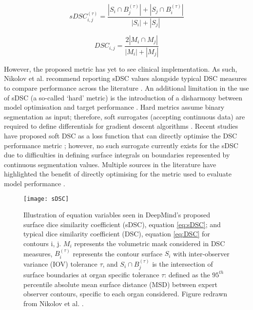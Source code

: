 \begin{equation}
sDSC_{i,j}^{(\tau)} = \frac{|S_{i} \cap B_{j}^{(\tau)}| + |S_{j} \cap B_{i}^{(\tau)}|}{|S_{i}| + |S_{j}|}
\label{eq:sDSC}
\end{equation}

\begin{equation}
DSC_{i,j} = \frac{2|M_{i} \cap M_{j}|}{|M_{i}| + |M_{j}|}
\label{eq:DSC}
\end{equation}

However, the proposed metric has yet to see clinical implementation. As such, Nikolov et al. recommend reporting sDSC values alongside typical DSC measures to compare performance across the literature \cite{Nikolov_2018}. An additional limitation in the use of sDSC (a so-called `hard' metric) is the introduction of a disharmony between model optimisation and target performance \cite{Bertels2019}. Hard metrics assume binary segmentation as input; therefore, soft surrogates (accepting continuous data) are required to define differentials for gradient descent algorithms \cite{Bertels2019}. Recent studies have proposed soft DSC as a loss function that can directly optimise the DSC performance metric \cite{Bertels2019}; however, no such surrogate currently exists for the sDSC due to difficulties in defining surface integrals on boundaries represented by continuous segmentation values. Multiple sources in the literature have highlighted the benefit of directly optimising for the metric used to evaluate model performance \cite{Bertels2019, Vapnik2000}.

\begin{figure}
	\begin{center}
		\texttt{[image: sDSC]}
		\caption{Illustration of equation variables seen in DeepMind's proposed surface dice similarity coefficient (sDSC), equation \ref{eq:sDSC}; and typical dice similarity coefficient (DSC), equation \ref{eq:DSC} for contours i, j. $M_{i}$ represents the volumetric mask considered in DSC measures, $B_{i}^{(\tau)}$ represents the contour surface $S_{i}$ with inter-observer variance (IOV) tolerance $\tau$, and $S_{i} \cap B_{j}^{(\tau)}$ is the intersection of surface boundaries at organ specific tolerance $\tau$: defined as the $95^{th}$ percentile absolute mean surface distance (MSD) between expert observer contours, specific to each organ considered. Figure redrawn from Nikolov et al. \cite{Nikolov_2018}.}
		\label{fig:sDSC}
	\end{center}
\end{figure}

